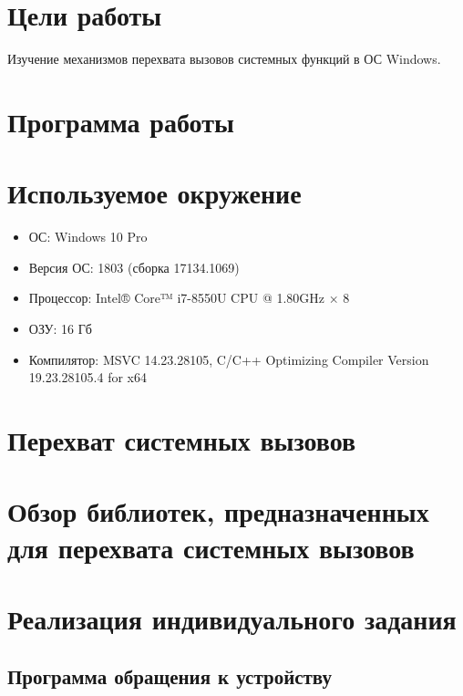 





\tableofcontents
\newpage

\section{Цели работы}

Изучение механизмов перехвата вызовов системных функций в ОС Windows.

\section{Программа работы}



\section{Используемое окружение}

\begin{itemize}
	\item ОС: Windows 10 Pro
	\item Версия ОС: 1803 (сборка 17134.1069)
	\item Процессор: Intel® Core™ i7-8550U CPU @ 1.80GHz × 8
	\item ОЗУ: 16 Гб
	\item Компилятор: MSVC 14.23.28105, C/C++ Optimizing Compiler Version 19.23.28105.4 for x64
\end{itemize}

\section{Перехват системных вызовов}

\section{Обзор библиотек, предназначенных для перехвата системных вызовов}

\section{Реализация индивидуального задания}

\subsection{Программа обращения к устройству}

